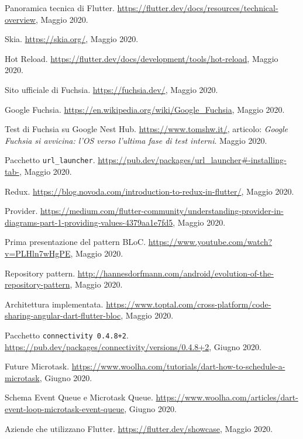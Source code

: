 \begin{thebibliography}{3}
Panoramica tecnica di Flutter. \url{https://flutter.dev/docs/resources/technical-overview}, Maggio 2020.

Skia. \url{https://skia.org/}, Maggio 2020.

Hot Reload. \url{https://flutter.dev/docs/development/tools/hot-reload}, Maggio 2020.

Sito ufficiale di Fuchsia. \url{https://fuchsia.dev/}, Maggio 2020.

Google Fuchsia. \url{https://en.wikipedia.org/wiki/Google_Fuchsia}, Maggio 2020.

Test di Fuchsia su Google Nest Hub. \url{https://www.tomshw.it/}, articolo: \textit{Google Fuchsia si avvicina: l’OS verso l’ultima fase di test interni}. Maggio 2020.

Pacchetto \verb|url_launcher|. \url{https://pub.dev/packages/url_launcher#-installing-tab-}, Maggio 2020.

Redux. \url{https://blog.novoda.com/introduction-to-redux-in-flutter/}, Maggio 2020.

Provider. \url{https://medium.com/flutter-community/understanding-provider-in-diagrams-part-1-providing-values-4379aa1e7fd5}, Maggio 2020.

Prima presentazione del pattern BLoC. \url{https://www.youtube.com/watch?v=PLHln7wHgPE}, Maggio 2020.

Repository pattern. \url{http://hannesdorfmann.com/android/evolution-of-the-repository-pattern}, Maggio 2020.

Architettura implementata. \url{https://www.toptal.com/cross-platform/code-sharing-angular-dart-flutter-bloc}, Maggio 2020.

Pacchetto \verb|connectivity 0.4.8+2|. \url{https://pub.dev/packages/connectivity/versions/0.4.8+2}, Giugno 2020.

Future Microtask. \url{https://www.woolha.com/tutorials/dart-how-to-schedule-a-microtask}, Giugno 2020.

Schema Event Queue e Microtask Queue. \url{https://www.woolha.com/articles/dart-event-loop-microtask-event-queue}, Giugno 2020.

Aziende che utilizzano Flutter. \url{https://flutter.dev/showcase}, Maggio 2020.


\end{thebibliography}
